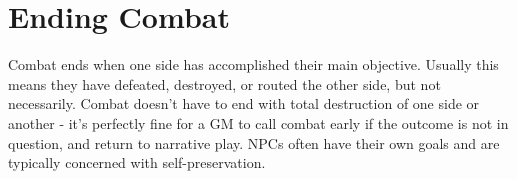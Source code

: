 \section{Ending Combat}
Combat ends when one side has accomplished their main objective. Usually this means they have defeated, destroyed, or routed the other side, but not necessarily. Combat doesn’t have to end with total destruction of one side or another - it’s perfectly fine for a GM to call combat early if the outcome is not in question, and return to narrative play. NPCs often have their own goals and are typically concerned with self-preservation. 